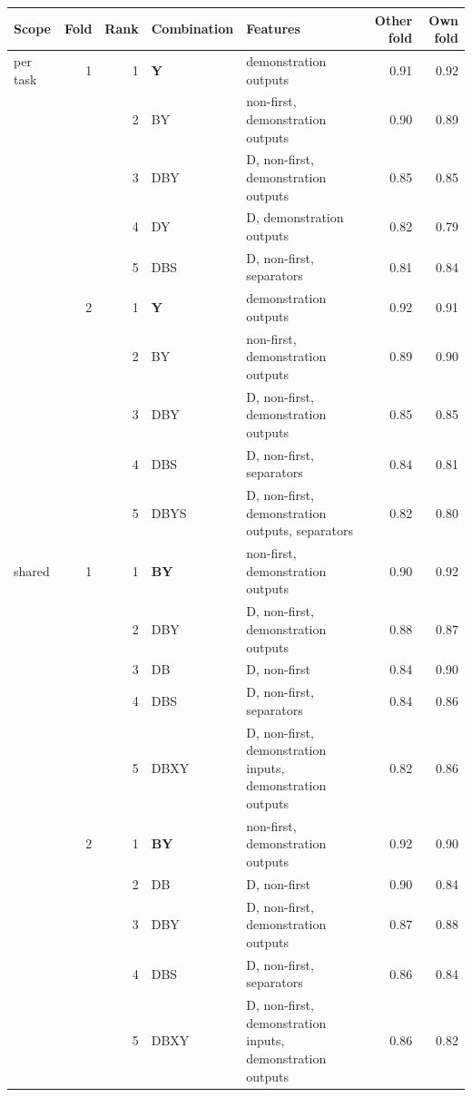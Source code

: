 \begin{tabular}{@{}lrrl>{\raggedright\arraybackslash}p{5.2cm}rr@{}}
\toprule
Scope & Fold & Rank & Combination & Features & Other fold & Own fold \\
\midrule
per task & 1 & 1 & \textbf{Y} & demonstration outputs & 0.91 & 0.92 \\
 &  & 2 & BY & non-first, demonstration outputs & 0.90 & 0.89 \\
 &  & 3 & DBY & D, non-first, demonstration outputs & 0.85 & 0.85 \\
 &  & 4 & DY & D, demonstration outputs & 0.82 & 0.79 \\
 &  & 5 & DBS & D, non-first, separators & 0.81 & 0.84 \\
\addlinespace
 & 2 & 1 & \textbf{Y} & demonstration outputs & 0.92 & 0.91 \\
 &  & 2 & BY & non-first, demonstration outputs & 0.89 & 0.90 \\
 &  & 3 & DBY & D, non-first, demonstration outputs & 0.85 & 0.85 \\
 &  & 4 & DBS & D, non-first, separators & 0.84 & 0.81 \\
 &  & 5 & DBYS & D, non-first, demonstration outputs, separators & 0.82 & 0.80 \\
\midrule
shared & 1 & 1 & \textbf{BY} & non-first, demonstration outputs & 0.90 & 0.92 \\
 &  & 2 & DBY & D, non-first, demonstration outputs & 0.88 & 0.87 \\
 &  & 3 & DB & D, non-first & 0.84 & 0.90 \\
 &  & 4 & DBS & D, non-first, separators & 0.84 & 0.86 \\
 &  & 5 & DBXY & D, non-first, demonstration inputs, demonstration outputs & 0.82 & 0.86 \\
\addlinespace
 & 2 & 1 & \textbf{BY} & non-first, demonstration outputs & 0.92 & 0.90 \\
 &  & 2 & DB & D, non-first & 0.90 & 0.84 \\
 &  & 3 & DBY & D, non-first, demonstration outputs & 0.87 & 0.88 \\
 &  & 4 & DBS & D, non-first, separators & 0.86 & 0.84 \\
 &  & 5 & DBXY & D, non-first, demonstration inputs, demonstration outputs & 0.86 & 0.82 \\
\bottomrule
\end{tabular}
